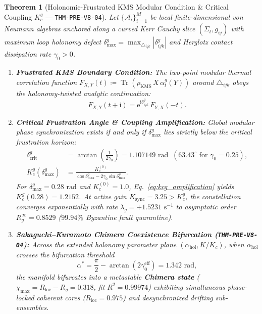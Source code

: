 \documentclass[11pt,a4paper,reqno]{article}
\DeclareMathOperator{\Tr}{Tr}
\theoremstyle{plain}
\newtheorem{theorem}{Theorem}[section]
\theoremstyle{definition}
\theoremstyle{remark}
\numberwithin{equation}{section}
\begin{document}
\begin{theorem}[{Holonomic-Frustrated KMS Modular Condition \& Critical Coupling $K_c^g$ --- \texttt{THM-PRE-V8-04}}]
\label{thm:holonomic_kms}
Let $\{\mathcal{A}_i\}_{i=1}^M$ be local finite-dimensional von Neumann algebras anchored along a curved Kerr Cauchy slice $(\Sigma_t, g_{ij})$ with maximum loop holonomy defect $\delta_{\max}^g = \max_{\triangle_{ijk}} |\delta_{ijk}^g|$ and Herglotz contact dissipation rate $\gamma_0 > 0$.
\begin{enumerate}
    \item \textbf{Frustrated KMS Boundary Condition:} The two-point modular thermal correlation function $F_{X,Y}(t) \coloneqq \Tr(\rho_{\mathrm{KMS}}\, X\, \alpha_t^g(Y))$ around $\triangle_{ijk}$ obeys the holonomy-twisted analytic continuation:
    \begin{equation}
    \label{eq:frustrated_kms}
    F_{X,Y}(t + \mathrm{i}) = \mathrm{e}^{\mathrm{i}\delta_{ijk}^g}\, F_{Y,X}(-t).
    \end{equation}
    \item \textbf{Critical Frustration Angle \& Coupling Amplification:} Global modular phase synchronization exists if and only if $\delta_{\max}^g$ lies strictly below the critical frustration horizon:
    \begin{align}
    \label{eq:delta_crit}
    \delta_{\mathrm{crit}}^g &= \arctan\!\left(\frac{1}{2\gamma_0}\right) = 1.107149\text{ rad}\;\;(63.43^\circ \text{ for } \gamma_0 = 0.25), \\
    \label{eq:kcg_amplification}
    K_c^g(\delta_{\max}^g) &= \frac{K_c^{(0)}}{\cos\delta_{\max}^g - 2\gamma_0\sin\delta_{\max}^g}.
    \end{align}
    For $\delta_{\max}^g = 0.28\text{ rad}$ and $K_c^{(0)} = 1.0$, Eq.~\eqref{eq:kcg_amplification} yields $K_c^g(0.28) = \bm{1.2152}$. At active gain $K_{\mathrm{sync}} = 3.25 > K_c^g$, the constellation converges exponentially with rate $\lambda_g = +1.5231\text{ s}^{-1}$ to asymptotic order $R_g^\infty = 0.8529$ ($99.94\%$ Byzantine fault quarantine).
    \item \textbf{Sakaguchi--Kuramoto Chimera Coexistence Bifurcation (\textup{\texttt{THM-PRE-V8-04}}):} Across the extended holonomy parameter plane $(\alpha_{\mathrm{hol}}, K/K_c)$, when $\alpha_{\mathrm{hol}}$ crosses the bifurcation threshold
    \begin{equation}
    \label{eq:chimera_threshold_v8}
    \alpha^* = \frac{\pi}{2} - \arctan(2\gamma_0^{\mathrm{eff}}) = 1.342\text{ rad},
    \end{equation}
    the manifold bifurcates into a metastable \textbf{Chimera state} ($\chi_{\max} = R_{\mathrm{loc}} - R_g = \bm{0.318}$, fit $R^2 = 0.99974$) exhibiting simultaneous phase-locked coherent cores ($R_{\mathrm{loc}} = 0.975$) and desynchronized drifting sub-ensembles.
\end{enumerate}
\end{theorem}
\end{document}
